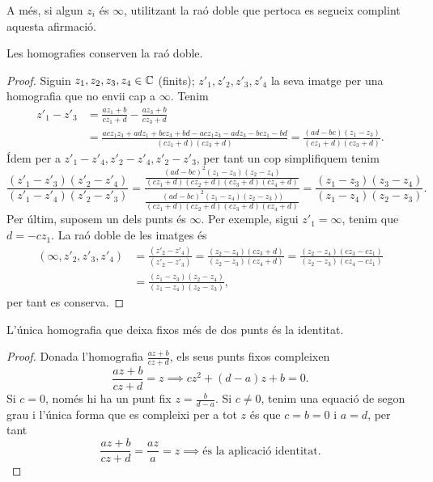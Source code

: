 \documentclass[dvipsnames, svgnames, leqno, a4paper, 12pt]{article}
\begin{document}
        A més, si algun $z_i$ és $\infty$, utilitzant la raó doble que pertoca es segueix complint aquesta afirmació.

    \begin{proposition}
        Les homografies conserven la raó doble.
    \end{proposition}

    \begin{proof}
        Siguin $z_1,z_2,z_3,z_4\in \mathbb{C}$ (finits); $z'_1,z'_2,z'_3,z'_4$ la seva imatge per una homografia que no envii cap a $\infty$. Tenim 
        \footnotesize
        \begin{align*}
            z'_1-z'_3 &=\frac{az_1+b}{cz_1+d}-\frac{az_3+b}{cz_3+d}\\
            &= \frac{acz_1z_3+adz_1+bcz_3+bd-acz_1z_3-adz_3-bcz_1-bd}{(cz_1+d)(cz_3+d)}
            = \frac{(ad-bc)(z_1-z_3)}{(cz_1+d)(cz_3+d)}.
        \end{align*}
        \normalsize
        Ídem per a $z'_1-z'_4, z'_2-z'_4, z'_2-z'_3$, per tant un cop simplifiquem tenim 
        \begin{displaymath}
            \frac{(z'_1-z'_3)(z'_2-z'_4)}{(z'_1-z'_4)(z'_2-z'_3)}=\frac{\frac{(ad-bc)^2(z_1-z_3)(z_2-z_4)}{(cz_1+d)(cz_2+d)(cz_3+d)(cz_4+d)}}{\frac{(ad-bc)^2(z_1-z_4)(z_2-z_3))}{(cz_1+d)(cz_2+d)(cz_3+d)(cz_4+d)}} = \frac{(z_1-z_3)(z_3-z_4)}{(z_1-z_4)(z_2-z_3)}.
        \end{displaymath}
        Per últim, suposem un dels punts és $\infty$. Per exemple, sigui $z'_1=\infty$, tenim que $d=-cz_1$. La raó doble de les imatges és 
        \begin{align*}
            (\infty,z'_2,z'_3,z'_4) &=\frac{(z'_2-z'_4)}{(z'_2-z'_3)}=\frac{(z_2-z_4)(cz_3+d)}{(z_2-z_3)(cz_4+d)}=\frac{(z_2-z_4)(cz_3-cz_1)}{(z_2-z_3)(cz_4-cz_1)}\\
            &=\frac{(z_1-z_3)(z_2-z_4)}{(z_1-z_4)(z_2-z_3)},
        \end{align*}
        per tant es conserva.
    \end{proof}

    \begin{theorem}
        L'única homografia que deixa fixos més de dos punts és la identitat.
    \end{theorem}

    \begin{proof}
        Donada l'homografia $\frac{az+b}{cz+d}$, els seus punts fixos compleixen 
        \begin{displaymath}
            \frac{az+b}{cz+d}=z\implies cz^2+(d-a)z+b=0.
        \end{displaymath}
        Si $c=0$, només hi ha un punt fix $z=\frac{b}{d-a}$. Si $c\neq0$, tenim una equació de segon grau i l'única forma que es compleixi per a tot $z$ és que $c=b=0$ i $a=d$, per tant 
        \begin{displaymath}
            \frac{az+b}{cz+d}=\frac{az}{a}=z\implies \text{és la aplicació identitat.}
        \end{displaymath}
    \end{proof}
\end{document}

